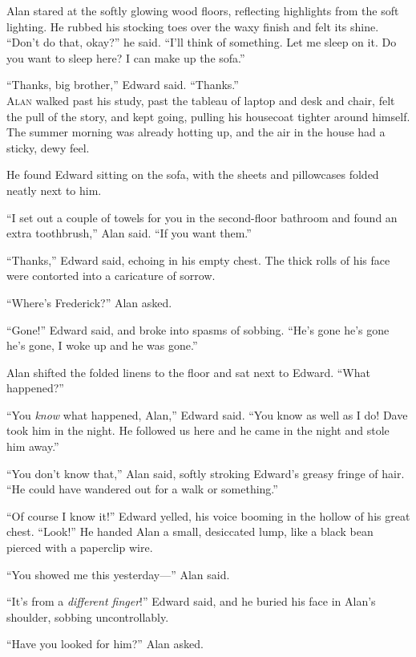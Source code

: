 \documentclass{article}
\begin{document}
Alan stared at the softly glowing wood floors, reflecting highlights
from the soft lighting.  He rubbed his stocking toes over the waxy
finish and felt its shine.  ``Don't do that, okay?'' he said.  ``I'll
think of something.  Let me sleep on it.  Do you want to sleep here? 
I can make up the sofa.''

``Thanks, big brother,'' Edward said.  ``Thanks.''
\\
\lettrine[lines=3, lhang=.5, nindent=0pt, findent=2pt]{A}{lan} walked past his study, past the tableau of laptop and desk and
chair, felt the pull of the story, and kept going, pulling his
housecoat tighter around himself.  The summer morning was already
hotting up, and the air in the house had a sticky, dewy feel.

He found Edward sitting on the sofa, with the sheets and pillowcases
folded neatly next to him.

``I set out a couple of towels for you in the second-floor bathroom
and found an extra toothbrush,'' Alan said.  ``If you want them.''

``Thanks,'' Edward said, echoing in his empty chest.  The thick rolls
of his face were contorted into a caricature of sorrow.

``Where's Frederick?'' Alan asked.

``Gone!'' Edward said, and broke into spasms of sobbing.  ``He's gone
he's gone he's gone, I woke up and he was gone.''

Alan shifted the folded linens to the floor and sat next to Edward. 
``What happened?''

``You \textit{know} what happened, Alan,'' Edward said.  ``You know as
well as I do!  Dave took him in the night.  He followed us here and he
came in the night and stole him away.''

``You don't know that,'' Alan said, softly stroking Edward's greasy
fringe of hair.  ``He could have wandered out for a walk or
something.''

``Of course I know it!'' Edward yelled, his voice booming in the
hollow of his great chest.  ``Look!'' He handed Alan a small,
desiccated lump, like a black bean pierced with a paperclip wire.

``You showed me this yesterday---'' Alan said.

``It's from a \textit{different finger}!'' Edward said, and he buried
his face in Alan's shoulder, sobbing uncontrollably.

``Have you looked for him?'' Alan asked.
\end{document}
